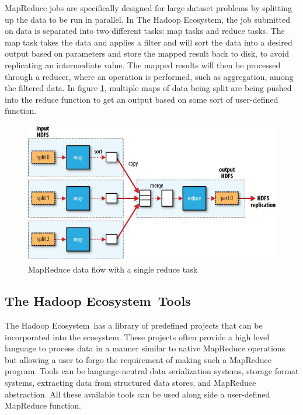 \documentclass[titlepage,twocolumn]{article}
\newcommand{\HadoopEcosystem}{Hadoop Ecosystem}
\begin{document}
MapReduce jobs are specifically designed for large dataset problems by splitting up the data to be run in parallel. In The \HadoopEcosystem, the job submitted on data is separated into two different tasks: map tasks and reduce tasks. The map task takes the data and applies a filter and will sort the data into a desired output based on parameters and store the mapped result back to disk, to avoid replicating an intermediate value. The mapped results will then be processed through a reducer, where an operation is performed, such as aggregation, among the filtered data. In figure \ref{fig:mapReduceDiagram}, multiple maps of data being split are being pushed into the reduce function to get an output based on some sort of user-defined function. 

\begin{figure}[H]
	\centering
	\includegraphics[scale=.35]{mapReduceDiagram.png}
	\caption{\small MapReduce data flow with a single reduce task \cite{fei_2011}}
	\label{fig:mapReduceDiagram}
\end{figure}

\subsection{The \HadoopEcosystem\ Tools}

The \HadoopEcosystem\ has a library of predefined projects that can be incorporated into the ecosystem. These projects often provide a high level language to process data in a manner similar to native MapReduce operations but allowing a user to forgo the requirement of making such a MapReduce program. Tools can be language-neutral data serialization systems, storage format systems, extracting data from structured data stores, and MapReduce abstraction. All these available tools can be used along side a user-defined  MapReduce function.  
\end{document}
